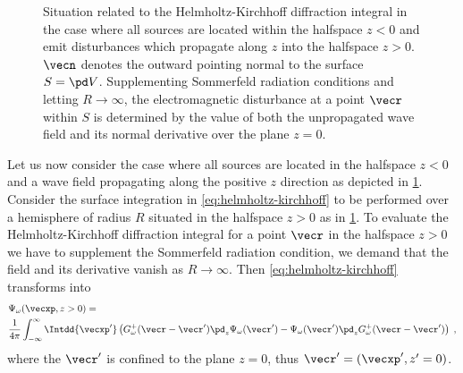 \documentclass[
twoside,
openright,
titlepage,
numbers=noenddot,
headinclude,
fleqn,
a4paper,
footinclude=true,
cleardoublepage=empty,
abstractoff,
BCOR=5mm,
paper=a4,
fontsize=11pt,
british,ngerman,american,
]{scrreprt}
\begin{document}
\begin{figure}
  \centering
  \small
  \caption[Situation related to a special case of the
  Helmholtz-Kirchhoff diffraction integral.]{Situation related to the
    Helmholtz-Kirchhoff diffraction integral in the case where all
    sources are located within the half\hyph space $z<0$ and emit
    disturbances which propagate along $z$ into the half\hyph space
    $z>0$.  $\vecn$ denotes the outward pointing normal to the surface
    $S=\pd V$.  Supplementing Sommerfeld radiation conditions and
    letting $R\to\infty$, the electromagnetic disturbance at a point
    $\vecr$ within $S$ is determined by the value of both the
    unpropagated wave field and its normal derivative over the plane
    $z=0$. }
     \label{fig:kirchhoff-2}
\end{figure}
Let us now consider the case where all sources are located in the
half\hyph space $z<0$ and a wave field propagating along the positive
$z$ direction as depicted in \cref{fig:kirchhoff-2}.  Consider the
surface integration in \cref{eq:helmholtz-kirchhoff} to be performed
over a hemisphere of radius $R$ situated in the half\hyph space
$z>0$ as in \cref{fig:kirchhoff-2}.  To evaluate the
Helmholtz-Kirchhoff diffraction integral for a point $\vecr$ in the
half\hyph space $z>0$ we have to supplement the Sommerfeld radiation
condition, \ie{} we demand that the field and its derivative vanish as
$R\to\infty$.  Then \cref{eq:helmholtz-kirchhoff} transforms into
\begin{equation}
  \label{eq:helmholtz-kirchhoff-plane}
  \begin{split}
      &\Psi_\omega(\vecxp,z>0) =
  \\ &\frac{1}{4\pi}\int_{-\infty}^{\infty}\Intdd{\vecxp'}
  \left(G^+_\omega(\vecr-\vecr')\pd_z\Psi_\omega(\vecr') 
    - \Psi_\omega(\vecr')\pd_z G^+_\omega(\vecr-\vecr') \right)\;,
  \end{split}
\end{equation}
where the $\vecr'$ is confined to the plane $z=0$, thus
$\vecr'=(\vecxp',z'=0)$.
\end{document}

